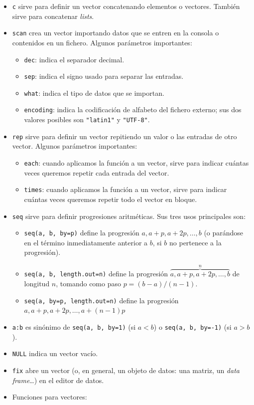 \documentclass[]{book}
\providecommand{\tightlist}{%
  \setlength{\itemsep}{0pt}\setlength{\parskip}{0pt}}
\theoremstyle{definition}
\theoremstyle{definition}
\theoremstyle{definition}
\theoremstyle{remark}
\begin{document}
\begin{itemize}
\tightlist
\item
  \texttt{c} sirve para definir un vector concatenando elementos o vectores. También sirve para concatenar \emph{lists}.
\item
  \texttt{scan} crea un vector importando datos que se entren en la consola o contenidos en un fichero. Algunos parámetros importantes:

  \begin{itemize}
  \tightlist
  \item
    \texttt{dec}: indica el separador decimal.
  \item
    \texttt{sep}: indica el signo usado para separar las entradas.
  \item
    \texttt{what}: indica el tipo de datos que se importan.
  \item
    \texttt{encoding}: indica la codificación de alfabeto del fichero externo;
    sus dos valores posibles son \texttt{"latin1"} y \texttt{"UTF-8"}.
  \end{itemize}
\item
  \texttt{rep} sirve para definir un vector repitiendo un valor o las entradas de otro vector. Algunos parámetros importantes:

  \begin{itemize}
  \tightlist
  \item
    \texttt{each}: cuando aplicamos la función a un vector, sirve para indicar cuántas veces queremos repetir cada entrada del vector.
  \item
    \texttt{times}: cuando aplicamos la función a un vector, sirve para indicar cuántas veces queremos repetir todo el vector en bloque.
  \end{itemize}
\item
  \texttt{seq} sirve para definir progresiones aritméticas. Sus tres usos principales son:

  \begin{itemize}
  \tightlist
  \item
    \texttt{seq(a,\ b,\ by=p)} define la progresión \(a, a+p, a+2p, \ldots, b\) (o parándose en el término inmediatamente anterior a \(b\), si \(b\) no pertenece a la progresión).
  \item
    \texttt{seq(a,\ b,\ length.out=n)} define la progresión \(\overbrace{a, a+p, a+2p, \ldots, b}^n\) de longitud \(n\), tomando como paso \(p=(b-a)/(n-1)\).
  \item
    \texttt{seq(a,\ by=p,\ length.out=n)} define la progresión \(a, a+p, a+2p, \ldots, a+(n-1)p\)
  \end{itemize}
\item
  \texttt{a:b} es sinónimo de \texttt{seq(a,\ b,\ by=1)} (si \(a<b\)) o \texttt{seq(a,\ b,\ by=-1)} (si \(a>b\)).
\item
  \texttt{NULL} indica un vector vacío.
\item
  \texttt{fix} abre un vector (o, en general, un objeto de datos: una matriz, un \emph{data frame}\ldots{}) en el editor de datos.
\item
  Funciones para vectores:


\end{itemize}
\end{document}
